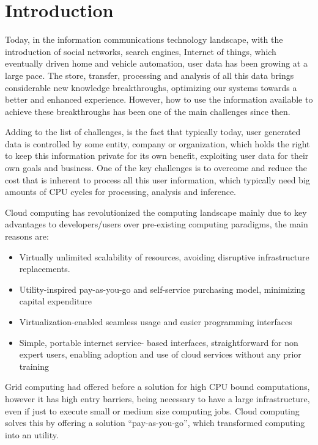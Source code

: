
% 
% 

\section{Introduction}

Today, in the information communications technology landscape, with the introduction of social networks, search engines, Internet of things, which eventually driven home and vehicle automation, user data has been growing at a large pace. The store, transfer, processing and analysis of all this data brings considerable new knowledge breakthroughs, optimizing our systems towards a better and enhanced experience. However, how to use the information available to achieve these breakthroughs has been one of the main challenges since then. 

Adding to the list of challenges, is the fact that typically today, user generated data is controlled by some entity, company or organization, which holds the right to keep this information private for its own benefit, exploiting user data for their own goals and business. One of the key challenges is to overcome and reduce the cost that is inherent to process all this user information, which typically need big amounts of CPU cycles for processing, analysis and inference.

Cloud computing has revolutionized the computing landscape mainly due to key advantages to developers/users over pre-existing computing paradigms, the main reasons are:
\begin{itemize}
  \item Virtually unlimited scalability of resources, avoiding disruptive infrastructure replacements.
  \item Utility-inspired pay-as-you-go and self-service purchasing model, minimizing capital expenditure
  \item Virtualization-enabled seamless usage and easier programming interfaces
  \item Simple, portable internet service- based interfaces, straightforward for non expert users, enabling adoption and use of cloud services without any prior training
 \end{itemize} 

Grid computing had offered before a solution for high CPU bound computations, however it has high entry barriers, being necessary to have a large infrastructure, even if just to execute small or medium size computing jobs. Cloud computing solves this by offering a solution ``pay-as-you-go'', which transformed computing into an utility.

